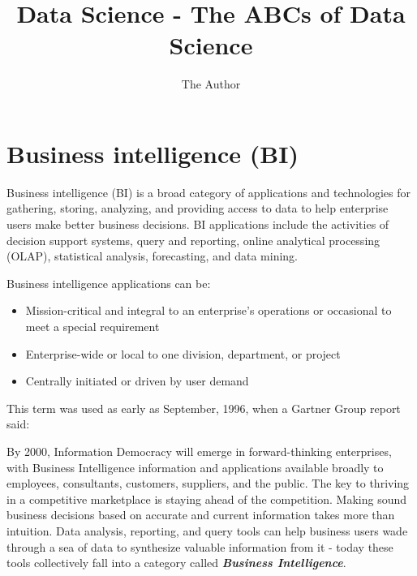 \documentclass[11pt]{article} %
\title{Data Science - The ABCs of Data Science}
\author{The Author}
\begin{document}
\maketitle

\tableofcontents



\section{Business intelligence (BI) }


Business intelligence (BI) is a broad category of applications and technologies for gathering, storing, analyzing, and providing access to data to help enterprise users make better business decisions. BI applications include the activities of decision support systems, query and reporting, online analytical processing (OLAP), statistical analysis, forecasting, and data mining.


Business intelligence applications can be:

\begin{itemize}
\item Mission-critical and integral to an enterprise's operations or occasional to meet a special requirement

\item 
Enterprise-wide or local to one division, department, or project

\item
Centrally initiated or driven by user demand
\end{itemize}


This term was used as early as September, 1996, when a Gartner Group report said:


By 2000, Information Democracy will emerge in forward-thinking enterprises, with Business Intelligence information and applications available broadly to employees, consultants, customers, suppliers, and the public. The key to thriving in a competitive marketplace is staying ahead of the competition. Making sound business decisions based on accurate and current information takes more than intuition. Data analysis, reporting, and query tools can help business users wade through a sea of data to synthesize valuable information from it - today these tools collectively fall into a category called \textbf{\textit{Business Intelligence}}.
\end{document}
